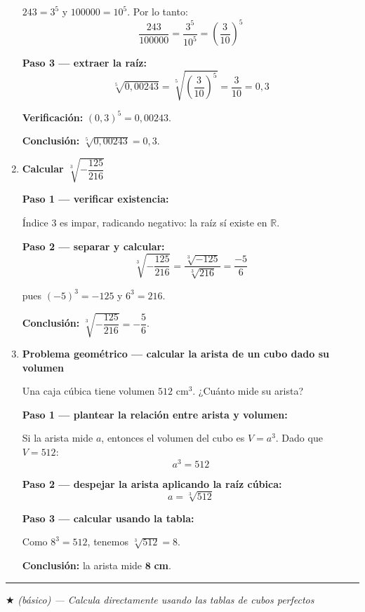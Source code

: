 \documentclass[11pt, letterpaper]{article}
\newcommand{\subbloque}[1]{%
  \vspace{14pt}
  \noindent{\large\bfseries\color{zenitnavy} #1}\par
  \vspace{4pt}\hrule height 1pt\vspace{8pt}}
\begin{document}
\begin{tcolorbox}[examplebox, title={Ejemplos}]
\begin{enumerate}[label=\textbf{Ej. \arabic*.}, leftmargin=*, itemsep=18pt]
$243 = 3^5$ y $100000 = 10^5$. Por lo tanto:
$$\frac{243}{100000} = \frac{3^5}{10^5} = \left(\frac{3}{10}\right)^5$$

\textbf{Paso 3 — extraer la raíz:}
$$\sqrt[5]{0{,}00243} = \sqrt[5]{\left(\frac{3}{10}\right)^5} = \frac{3}{10} = 0{,}3$$

\textbf{Verificación:} $(0{,}3)^5 = 0{,}00243$. \checkmark

\textbf{Conclusión:} $\sqrt[5]{0{,}00243} = 0{,}3$.

\item \textbf{Calcular $\sqrt[3]{-\dfrac{125}{216}}$}

\textbf{Paso 1 — verificar existencia:}

Índice 3 es impar, radicando negativo: la raíz sí existe en $\mathbb{R}$.

\textbf{Paso 2 — separar y calcular:}
$$\sqrt[3]{-\frac{125}{216}} = \frac{\sqrt[3]{-125}}{\sqrt[3]{216}} = \frac{-5}{6}$$

pues $(-5)^3 = -125$ y $6^3 = 216$.

\textbf{Conclusión:} $\sqrt[3]{-\dfrac{125}{216}} = -\dfrac{5}{6}$.

\item \textbf{Problema geométrico — calcular la arista de un cubo dado su volumen}

Una caja cúbica tiene volumen $512$ cm$^3$. ¿Cuánto mide su arista?

\textbf{Paso 1 — plantear la relación entre arista y volumen:}

Si la arista mide $a$, entonces el volumen del cubo es $V = a^3$. Dado que $V = 512$:
$$a^3 = 512$$

\textbf{Paso 2 — despejar la arista aplicando la raíz cúbica:}
$$a = \sqrt[3]{512}$$

\textbf{Paso 3 — calcular usando la tabla:}

Como $8^3 = 512$, tenemos $\sqrt[3]{512} = 8$.

\textbf{Conclusión:} la arista mide $\mathbf{8}$ \textbf{cm}.

\end{enumerate}
\end{tcolorbox}

\subbloque{Ejercicios propuestos}

$\bigstar$ \textit{(básico) — Calcula directamente usando las tablas de cubos perfectos}
\end{document}
